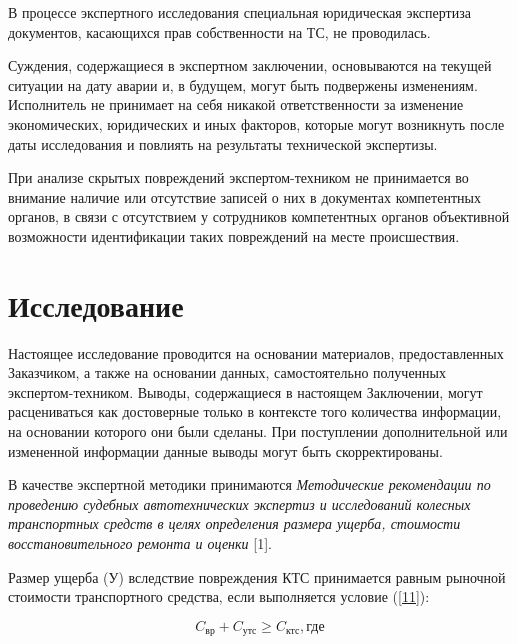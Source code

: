 \begin{itemize}
\item  {В процессе экспертного исследования специальная юридическая экспертиза документов, касающихся прав собственности на ТС, не проводилась.}
\item  {Суждения, содержащиеся в экспертном заключении, основываются на текущей ситуации на дату аварии и, в будущем, могут быть подвержены изменениям.
Исполнитель не принимает на себя никакой ответственности за изменение экономических, юридических и иных факторов, которые могут возникнуть после даты исследования и повлиять на результаты технической экспертизы.
\item При анализе скрытых повреждений экспертом-техником не принимается во внимание наличие или отсутствие записей о них в документах компетентных органов, в связи с отсутствием у сотрудников компетентных органов объективной возможности  идентификации таких повреждений на месте происшествия.
}\end{itemize}
%
%
\section{Исследование}
%
Настоящее исследование проводится на основании материалов, предоставленных Заказчиком, а также на основании данных, самостоятельно полученных экспертом-техником. Выводы, содержащиеся в настоящем Заключении, могут расцениваться как достоверные только в контексте того количества информации, на основании которого они были сделаны. При поступлении дополнительной или измененной информации данные выводы могут быть
скорректированы. 

\par  В качестве экспертной методики принимаются \emph{Методические рекомендации по проведению судебных автотехнических экспертиз и исследований колесных транспортных средств в целях определения размера ущерба, стоимости восстановительного ремонта и оценки} [1].


\par Размер ущерба (У) вследствие повреждения КТС принимается равным рыночной стоимости транспортного средства, если выполняется условие (\ref{11}):

\begin{equation}\label{11}
	C_\text{вр} + C_\text{утс} \geq  C_\text{ктс},    \text{где}
\end{equation}

